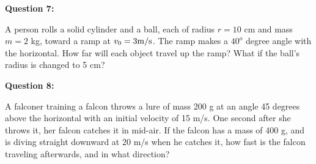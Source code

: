 \documentclass[12pt]{article}
\begin{document}
{\bf Question 7:}

  A person rolls a solid cylinder and a ball, each of radius $r=10$ cm and mass $m=2$ kg, toward a ramp at $v_0 = 3 \rm m/\rm s$. The ramp makes a $40^o$ degree angle with the horizontal.
    How far will each object travel up the ramp? What if the ball's radius is changed to 5 cm?

{\bf Question 8:}

A falconer training a falcon throws a lure of mass 200 g at an angle 45 degrees above the horizontal with an initial velocity of 15 m/s. One second after she throws it, her falcon catches it in mid-air. If the falcon has a mass of 400 g, and is diving straight
downward at 20 m/s when he catches it, how fast is the falcon traveling afterwards, and in what direction?
\end{document}
